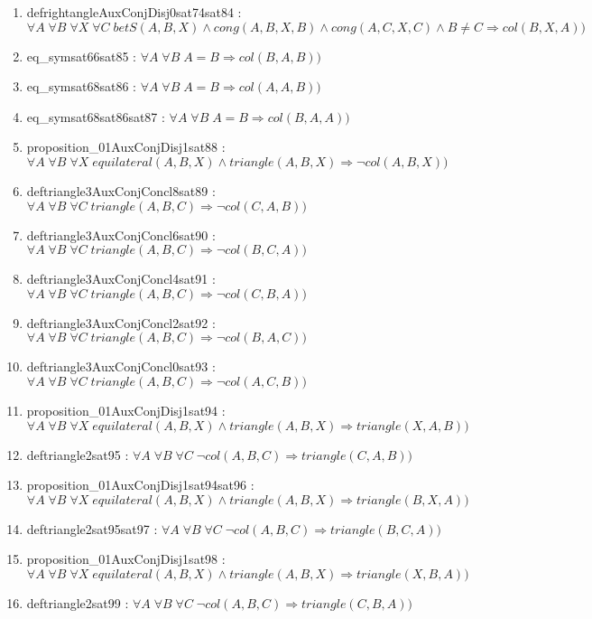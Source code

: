 \documentclass{article}
\begin{document}
\begin{enumerate}
\item defrightangleAuxConjDisj0sat74sat84 : $\forall A\;\forall B\;\forall X\;\forall C\;betS(A, B, X)\wedge cong(A, B, X, B)\wedge cong(A, C, X, C)\wedge B \neq C \Rightarrow col(B, X, A))$
\item eq\_symsat66sat85 : $\forall A\;\forall B\;A = B \Rightarrow col(B, A, B))$
\item eq\_symsat68sat86 : $\forall A\;\forall B\;A = B \Rightarrow col(A, A, B))$
\item eq\_symsat68sat86sat87 : $\forall A\;\forall B\;A = B \Rightarrow col(B, A, A))$
\item proposition\_01AuxConjDisj1sat88 : $\forall A\;\forall B\;\forall X\;equilateral(A, B, X)\wedge triangle(A, B, X) \Rightarrow \neg col(A, B, X))$
\item deftriangle3AuxConjConcl8sat89 : $\forall A\;\forall B\;\forall C\;triangle(A, B, C) \Rightarrow \neg col(C, A, B))$
\item deftriangle3AuxConjConcl6sat90 : $\forall A\;\forall B\;\forall C\;triangle(A, B, C) \Rightarrow \neg col(B, C, A))$
\item deftriangle3AuxConjConcl4sat91 : $\forall A\;\forall B\;\forall C\;triangle(A, B, C) \Rightarrow \neg col(C, B, A))$
\item deftriangle3AuxConjConcl2sat92 : $\forall A\;\forall B\;\forall C\;triangle(A, B, C) \Rightarrow \neg col(B, A, C))$
\item deftriangle3AuxConjConcl0sat93 : $\forall A\;\forall B\;\forall C\;triangle(A, B, C) \Rightarrow \neg col(A, C, B))$
\item proposition\_01AuxConjDisj1sat94 : $\forall A\;\forall B\;\forall X\;equilateral(A, B, X)\wedge triangle(A, B, X) \Rightarrow triangle(X, A, B))$
\item deftriangle2sat95 : $\forall A\;\forall B\;\forall C\;\neg col(A, B, C) \Rightarrow triangle(C, A, B))$
\item proposition\_01AuxConjDisj1sat94sat96 : $\forall A\;\forall B\;\forall X\;equilateral(A, B, X)\wedge triangle(A, B, X) \Rightarrow triangle(B, X, A))$
\item deftriangle2sat95sat97 : $\forall A\;\forall B\;\forall C\;\neg col(A, B, C) \Rightarrow triangle(B, C, A))$
\item proposition\_01AuxConjDisj1sat98 : $\forall A\;\forall B\;\forall X\;equilateral(A, B, X)\wedge triangle(A, B, X) \Rightarrow triangle(X, B, A))$
\item deftriangle2sat99 : $\forall A\;\forall B\;\forall C\;\neg col(A, B, C) \Rightarrow triangle(C, B, A))$

\end{enumerate}
\end{document}
